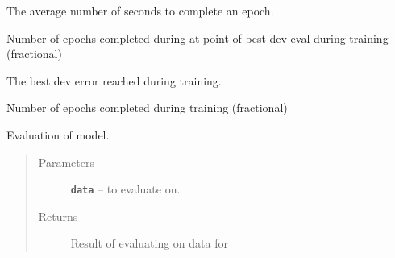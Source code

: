 \documentclass[letterpaper,10pt,english]{sphinxmanual}
\begin{document}
\begin{fulllineitems}
\begin{fulllineitems}
\label{generic_model:generic_model.Model.average_secs_per_epoch}
The average number of seconds to complete an epoch.

\end{fulllineitems}


\begin{fulllineitems}
\label{generic_model:generic_model.Model.best_completed_epochs}
Number of epochs completed during at point of best dev eval during training (fractional)

\end{fulllineitems}


\begin{fulllineitems}
\label{generic_model:generic_model.Model.best_dev_error}
The best dev error reached during training.

\end{fulllineitems}


\begin{fulllineitems}
\label{generic_model:generic_model.Model.completed_epochs}
Number of epochs completed during training (fractional)

\end{fulllineitems}


\begin{fulllineitems}
\label{generic_model:generic_model.Model.eval}
Evaluation of model.
\begin{quote}\begin{description}
\item[{Parameters}] \leavevmode
\textbf{\texttt{data}} -- {\hyperref[loader:loader.DataSet]{\emph{}}} to evaluate on.

\item[{Returns}] \leavevmode
Result of evaluating on data for 


\end{description}
\end{quote}
\end{fulllineitems}
\end{fulllineitems}
\end{document}
